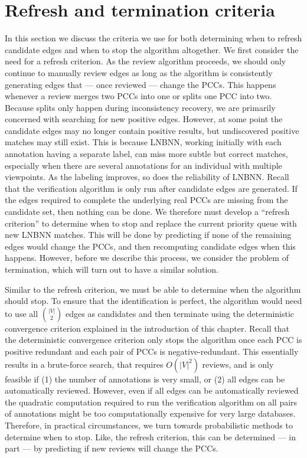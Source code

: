 \section{Refresh and termination criteria}\label{sec:converge}


In this section we discuss the criteria we use for both determining when to refresh candidate edges and when to
  stop the algorithm altogether.
We first consider the need for a refresh criterion.
As the review algorithm proceeds, we should only continue to manually review edges as long as the algorithm is
  consistently generating edges that --- once reviewed --- change the PCCs.
This happens whenever a review merges two PCCs into one or splits one PCC into two.
Because splits only happen during inconsistency recovery, we are primarily concerned with searching for new
  positive edges.
However, at some point the candidate edges may no longer contain positive results, but undiscovered positive
  matches may still exist.
This is because LNBNN, working initially with each annotation having a separate label, can miss more subtle but
  correct matches, especially when there are several annotations for an individual with multiple viewpoints.
As the labeling improves, so does the reliability of LNBNN.
Recall that the verification algorithm is only run after candidate edges are generated.
If the edges required to complete the underlying real PCCs are missing from the candidate set, then nothing can
  be done.
We therefore must develop a ``refresh criterion'' to determine when to stop and replace the current priority
  queue with new LNBNN matches.
This will be done by predicting if none of the remaining edges would change the PCCs, and then recomputing
  candidate edges when this happens.
However, before we describe this process, we consider the problem of termination, which will turn out to have a
  similar solution.

Similar to the refresh criterion, we must be able to determine when the algorithm should stop.
To ensure that the identification is perfect, the algorithm would need to use all $\binom{|V|}{2}$ edges as
  candidates and then terminate using the deterministic convergence criterion explained in the introduction of this
  chapter.
Recall that the deterministic convergence criterion only stops the algorithm once each PCC is positive redundant
  and each pair of PCCs is negative-redundant.
This essentially results in a brute-force search, that requires $O(|V|^2)$ reviews, and is only feasible if
(1) the number of annotations is very small, or
(2) all edges can be automatically reviewed.
However, even if all edges can be automatically reviewed the quadratic computation required to run the
  verification algorithm on all pairs of annotations might be too computationally expensive for very large
  databases.
Therefore, in practical circumstances, we turn towards probabilistic methods to determine when to stop.
Like, the refresh criterion, this can be determined --- in part --- by predicting if new reviews will change the
  PCCs.

